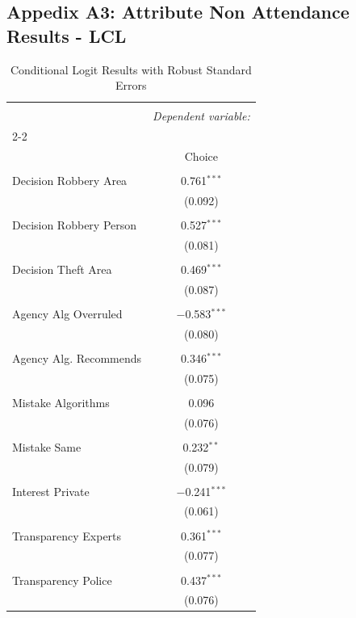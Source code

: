 \subsection*{Appedix A3: Attribute Non Attendance Results - LCL}
\begin{table}[!htbp] \centering 
  \caption{Conditional Logit Results with Robust Standard Errors} 
  \label{condlogit} 
\begin{tabular}{@{\extracolsep{5pt}}lc} 
\\[-1.8ex]\hline 
\hline \\[-1.8ex] 
 & \multicolumn{1}{c}{\textit{Dependent variable:}} \\ 
\cline{2-2} 
\\[-1.8ex] & Choice \\ 
\hline \\[-1.8ex] 
 Decision Robbery Area & 0.761$^{***}$ \\ 
  & (0.092) \\ 
  & \\ 
 Decision Robbery Person & 0.527$^{***}$ \\ 
  & (0.081) \\ 
  & \\ 
 Decision Theft Area & 0.469$^{***}$ \\ 
  & (0.087) \\ 
  & \\ 
 Agency Alg Overruled & $-$0.583$^{***}$ \\ 
  & (0.080) \\ 
  & \\ 
 Agency Alg. Recommends & 0.346$^{***}$ \\ 
  & (0.075) \\ 
  & \\ 
 Mistake Algorithms & 0.096 \\ 
  & (0.076) \\ 
  & \\ 
 Mistake Same & 0.232$^{**}$ \\ 
  & (0.079) \\ 
  & \\ 
 Interest Private & $-$0.241$^{***}$ \\ 
  & (0.061) \\ 
  & \\ 
 Transparency Experts & 0.361$^{***}$ \\ 
  & (0.077) \\ 
  & \\ 
 Transparency Police & 0.437$^{***}$ \\ 
  & (0.076) \\ 

\end{tabular}
\end{table}
